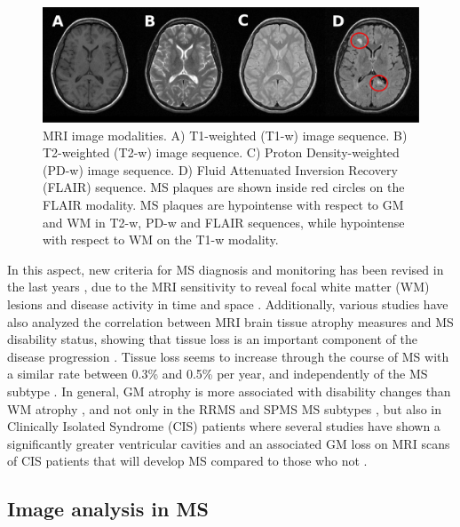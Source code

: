 \begin{figure}[top]
  \begin{center}
    \includegraphics[width=1\textwidth]{figures/figure_1.eps}
  \end{center}
    \caption[MRI image modalities]{MRI image modalities. A) T1-weighted (T1-w) image sequence. B) T2-weighted (T2-w) image sequence. C) Proton Density-weighted (PD-w) image sequence. D) Fluid Attenuated Inversion Recovery (FLAIR) sequence. MS plaques are shown inside red circles on the FLAIR modality. MS plaques are hypointense with respect to GM and WM in T2-w, PD-w and FLAIR sequences, while hypointense with respect to WM on the T1-w modality.}
    \label{mri_modalities}
\end{figure}

In this aspect, new criteria for MS diagnosis and monitoring has been revised in the last years \cite{Polman2011}, due to the MRI sensitivity to reveal focal white matter (WM) lesions and disease activity in time and space \cite{Filippi2011}. Additionally, various studies have also analyzed the correlation between MRI brain tissue atrophy measures and MS disability status, showing that tissue loss is an important component of the disease progression \cite{Chard2002, Filippi2013, Fisher2008, Rudick2009}. Tissue loss seems to increase through the course of MS with a similar rate between 0.3\% and 0.5\% per year, and independently of the MS subtype \cite{DeStefano2010, Rudick2009}. In general, GM atrophy is more associated with disability changes than WM atrophy \cite{Fisniku2008}, and not only in the RRMS and SPMS MS subtypes \cite{Fisher2008, Rudick2009}, but also in Clinically Isolated Syndrome (CIS) patients where several studies have shown a significantly greater ventricular cavities and an associated GM loss on MRI scans of CIS patients that will develop MS compared to those who not \cite{Ceccarelli2010,Filippi2013}.

\subsection{Image analysis in MS}
\label{subsec:image_analysis}

